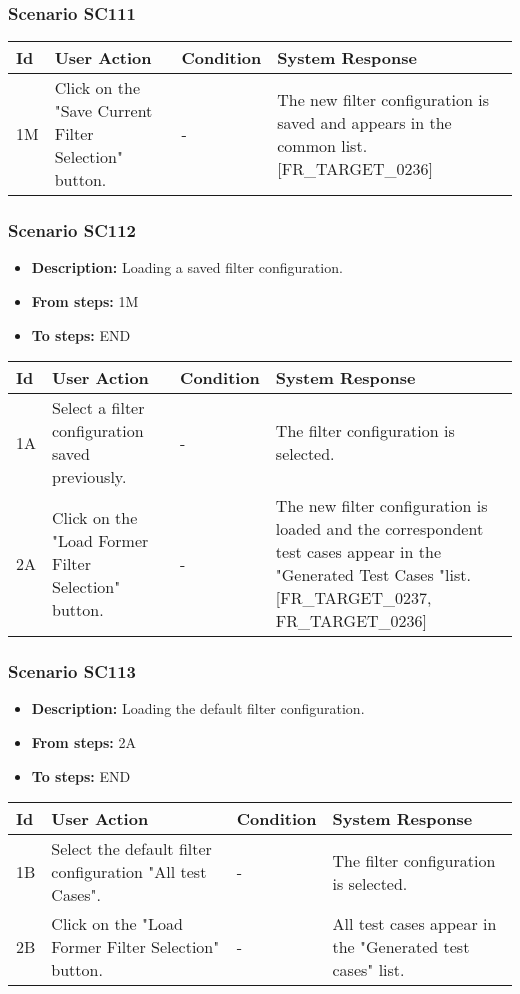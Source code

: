 \documentclass[a4paper,11pt]{article}
\newcommand{\bl}{\\ \hline}
\begin{document}
\subsubsection*{Scenario SC111}
\begin{tabular}{|p{0.4in}|p{1.5in}|p{1.5in}|p{1.5in}|}
\hline
Id & User Action & Condition & System Response \bl 
1M & Click on the "Save Current Filter Selection" button.
					 & - & The new filter configuration is saved and appears in the
						common list. [FR_TARGET_0236]\bl
\end{tabular}
\subsubsection*{Scenario SC112}
\begin{itemize}
\item {\bf Description:} Loading a saved filter configuration.
\item {\bf From steps:} 1M
\item {\bf To steps:} END
\end{itemize}
\begin{tabular}{|p{0.4in}|p{1.5in}|p{1.5in}|p{1.5in}|}
\hline
Id & User Action & Condition & System Response \bl 
1A & Select a filter configuration saved previously. & - & The filter configuration is selected. \bl
2A & Click on the "Load Former Filter Selection" button.
					 & - & The new filter configuration is loaded and the
						correspondent test cases appear in the "Generated Test Cases
						"list. [FR_TARGET_0237, FR_TARGET_0236]\bl
\end{tabular}
\subsubsection*{Scenario SC113}
\begin{itemize}
\item {\bf Description:} Loading the default filter configuration.
\item {\bf From steps:} 2A
\item {\bf To steps:} END
\end{itemize}
\begin{tabular}{|p{0.4in}|p{1.5in}|p{1.5in}|p{1.5in}|}
\hline
Id & User Action & Condition & System Response \bl 
1B & Select the default filter configuration "All test Cases".
					 & - & The filter configuration is selected.\bl
2B & Click on the "Load Former Filter Selection" button.
					 & - & All test cases appear in the "Generated test cases" list.
					\bl
\end{tabular}
\end{document}
